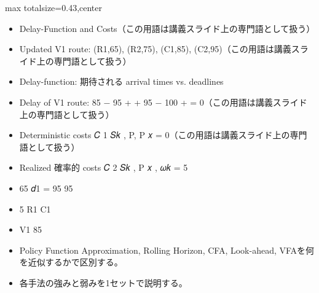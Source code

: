 \clearpage
{}
\begin{minipage}[t]{0.405\textwidth}
\begin{adjustbox}{max totalsize={\textwidth}{0.43\textheight},center}
\begin{minipage}{\textwidth}\scriptsize
{}\begin{itemize}
\item Delay-Function and Costs（この用語は講義スライド上の専門語として扱う）
\item Updated V1 route: (R1,65), (R2,75), (C1,85), (C2,95)（この用語は講義スライド上の専門語として扱う）
\item Delay-function: 期待される arrival times vs. deadlines
\item Delay of V1 route: 85 − 95 + + 95 − 100 + = 0（この用語は講義スライド上の専門語として扱う）
\item Deterministic costs 𝐶 1 𝑆𝑘 , P, P 𝑥 = 0（この用語は講義スライド上の専門語として扱う）
\item Realized 確率的 costs 𝐶 2 𝑆𝑘 , P 𝑥 , 𝜔𝑘 = 5
\item 65 𝑑1 = 95 95
\item 5 R1 C1
\item V1 85
\end{itemize}\begin{itemize}
\item Policy Function Approximation, Rolling Horizon, CFA, Look-ahead, VFAを何を近似するかで区別する。
\item 各手法の強みと弱みを1セットで説明する。
\end{itemize}
\end{minipage}
\end{adjustbox}
\end{minipage}\hfill
